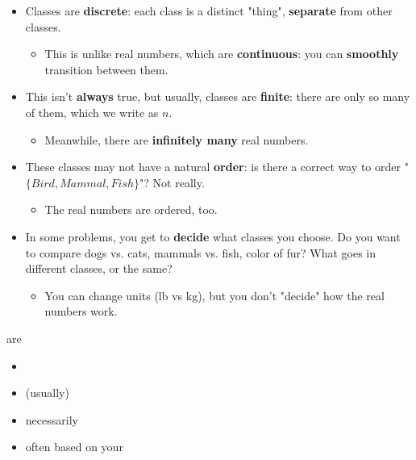         \begin{itemize}
            \item Classes are \textbf{discrete}: each class is a distinct "thing", \textbf{separate} from other classes.
            
                \begin{itemize}
                    \item This is unlike real numbers, which are \textbf{continuous}: you can \textbf{smoothly} transition between them.
                \end{itemize}
            
            \item This isn't \textbf{always} true, but usually, classes are \textbf{finite}: there are only so many of them, which we write as $n$.
            
                \begin{itemize}
                    \item Meanwhile, there are \textbf{infinitely many} real numbers.
                \end{itemize}
            
            \item These classes may not have a natural \textbf{order}: is there a correct way to order "$\{ Bird, Mammal, Fish \}$"? Not really.
            
                \begin{itemize}
                    \item The real numbers are ordered, too.
                \end{itemize}
                
            \item In some problems, you get to \textbf{decide} what classes you choose. Do you want to compare dogs vs. cats, mammals vs. fish, color of fur? What goes in different classes, or the same?
            
                \begin{itemize}
                    \item You can change units (lb vs kg), but you don't "decide" how the real numbers work.\\
                \end{itemize}
        \end{itemize}
        
        \begin{concept}
             are 
            \begin{itemize}
                \item {}
                \item {} (usually)
                \item {} necessarily 
                \item often  based on your 
            \end{itemize}
        \end{concept}
        
